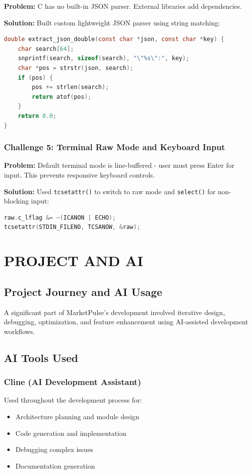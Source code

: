 \documentclass[12pt,a4paper]{article}
\begin{document}
\textbf{Problem:} C has no built-in JSON parser. External libraries add dependencies.

\textbf{Solution:} Built custom lightweight JSON parser using string matching:

\begin{lstlisting}[language=C]
double extract_json_double(const char *json, const char *key) {
    char search[64];
    snprintf(search, sizeof(search), "\"%s\":", key);
    char *pos = strstr(json, search);
    if (pos) {
        pos += strlen(search);
        return atof(pos);
    }
    return 0.0;
}
\end{lstlisting}

\subsubsection{Challenge 5: Terminal Raw Mode and Keyboard Input}

\textbf{Problem:} Default terminal mode is line-buffered - user must press Enter for input. This prevents responsive keyboard controls.

\textbf{Solution:} Used \texttt{tcsetattr()} to switch to raw mode and \texttt{select()} for non-blocking input:

\begin{lstlisting}[language=C]
raw.c_lflag &= ~(ICANON | ECHO);
tcsetattr(STDIN_FILENO, TCSANOW, &raw);
\end{lstlisting}

\newpage

\section{PROJECT AND AI}

\subsection{Project Journey and AI Usage}

A significant part of MarketPulse's development involved iterative design, debugging, optimization, and feature enhancement using AI-assisted development workflows.

\subsection{AI Tools Used}

\subsubsection{Cline (AI Development Assistant)}
Used throughout the development process for:
\begin{itemize}[itemsep=0.3em]
    \item Architecture planning and module design
    \item Code generation and implementation
    \item Debugging complex issues
    \item Documentation generation
\end{itemize}
\end{document}
